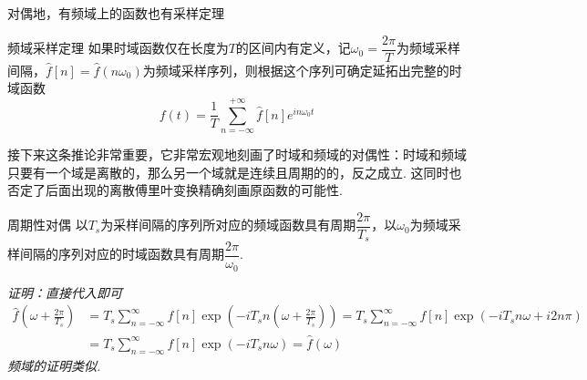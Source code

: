 \documentclass[main.tex]{subfiles}
\begin{document}
对偶地，有频域上的函数也有采样定理
\begin{corollary}{频域采样定理}
    如果时域函数仅在长度为\(T\)的区间内有定义，记\(\omega_0=\dfrac{2\pi}{T}\)为频域采样间隔，\(\hat{f}[n]=\hat{f}(n\omega_0)\)为频域采样序列，则根据这个序列可确定延拓出完整的时域函数
    \[f(t)=\frac{1}{T}\sum_{n=-\infty}^{+\infty}\hat{f}[n]e^{in\omega_0t}\]
\end{corollary}

接下来这条推论非常重要，它非常宏观地刻画了时域和频域的对偶性：时域和频域只要有一个域是离散的，那么另一个域就是连续且周期的的，反之成立. 这同时也否定了后面出现的离散傅里叶变换精确刻画原函数的可能性.

\begin{corollary}{周期性对偶}
    以\(T_s\)为采样间隔的序列所对应的频域函数具有周期\(\dfrac{2\pi}{T_s}\)，以\(\omega_0\)为频域采样间隔的序列对应的时域函数具有周期\(\dfrac{2\pi}{\omega_0}\).
\end{corollary}
\textit{
    证明：直接代入即可
    \begin{align*}
        \hat{f}\left(\omega+\frac{2\pi}{T_s}\right) &= T_s \sum_{n=-\infty}^{\infty}f[n]\exp\left(-iT_sn(\omega+\frac{2\pi}{T_s})\right) = T_s \sum_{n=-\infty}^{\infty}f[n]\exp\left(-iT_sn\omega+i2n\pi\right) \\
        &= T_s \sum_{n=-\infty}^{\infty}f[n]\exp(-iT_sn\omega) = \hat{f}(\omega)
    \end{align*}
    频域的证明类似.
}
\vspace{1.0cm}
\end{document}
